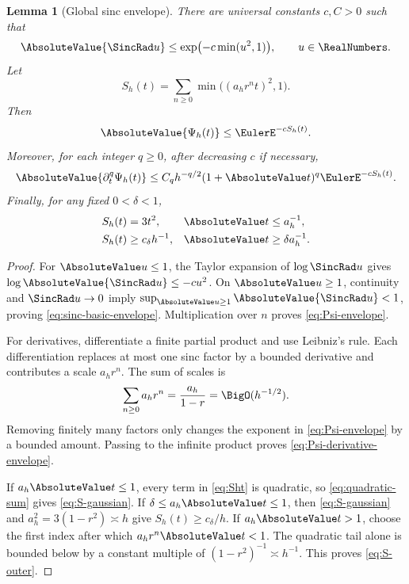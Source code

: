 \documentclass[11pt]{article}
\numberwithin{equation}{section}
\newtheorem{lemma}[theorem]{Lemma}
\theoremstyle{definition}
\begin{document}
\begin{lemma}[Global sinc envelope]\label{lem:sinc-envelope}
There are universal constants \(c,C>0\) such that
\begin{equation}\label{eq:sinc-basic-envelope}
 \AbsoluteValue{\SincRad u}\le\exp\bigl(-c\min(u^2,1)\bigr),\qquad u\in\RealNumbers.
\end{equation}
Let
\begin{equation}\label{eq:Sht}
 S_h(t)=\sum_{n\ge0}\min\bigl((a_hr^nt)^2,1\bigr).
\end{equation}
Then
\begin{equation}\label{eq:Psi-envelope}
 \AbsoluteValue{\Psi_h(t)}\le\EulerE^{-cS_h(t)}.
\end{equation}
Moreover, for each integer \(q\ge0\), after decreasing \(c\) if necessary,
\begin{equation}\label{eq:Psi-derivative-envelope}
 \AbsoluteValue{\partial_t^q\Psi_h(t)}
 \le C_qh^{-q/2}(1+\AbsoluteValue t)^q\EulerE^{-cS_h(t)}.
\end{equation}
Finally, for any fixed \(0<\delta<1\),
\begin{align}
 S_h(t)&=3t^2,
 &&\AbsoluteValue t\le a_h^{-1},\label{eq:S-gaussian}\\
 S_h(t)&\ge c_\delta h^{-1},
 &&\AbsoluteValue t\ge\delta a_h^{-1}.\label{eq:S-outer}
\end{align}
\end{lemma}

\begin{proof}
For \(\AbsoluteValue u\le1\), the Taylor expansion of \(\log\SincRad u\) gives \(\log\AbsoluteValue{\SincRad u}\le-cu^2\).  On \(\AbsoluteValue u\ge1\), continuity and \(\SincRad u\to0\) imply \(\sup_{\AbsoluteValue u\ge1}\AbsoluteValue{\SincRad u}<1\), proving \eqref{eq:sinc-basic-envelope}.  Multiplication over \(n\) proves \eqref{eq:Psi-envelope}.

For derivatives, differentiate a finite partial product and use Leibniz's rule.  Each differentiation replaces at most one sinc factor by a bounded derivative and contributes a scale \(a_hr^n\).  The sum of scales is
\[
 \sum_{n\ge0}a_hr^n=\frac{a_h}{1-r}=\BigO(h^{-1/2}).
\]
Removing finitely many factors only changes the exponent in \eqref{eq:Psi-envelope} by a bounded amount.  Passing to the infinite product proves \eqref{eq:Psi-derivative-envelope}.

If \(a_h\AbsoluteValue t\le1\), every term in \eqref{eq:Sht} is quadratic, so \eqref{eq:quadratic-sum} gives \eqref{eq:S-gaussian}.  If \(\delta\le a_h\AbsoluteValue t\le1\), then \eqref{eq:S-gaussian} and \(a_h^2=3(1-r^2)\asymp h\) give \(S_h(t)\ge c_\delta/h\).  If \(a_h\AbsoluteValue t>1\), choose the first index after which \(a_hr^n\AbsoluteValue t<1\).  The quadratic tail alone is bounded below by a constant multiple of \((1-r^2)^{-1}\asymp h^{-1}\).  This proves \eqref{eq:S-outer}.
\end{proof}
\end{document}
